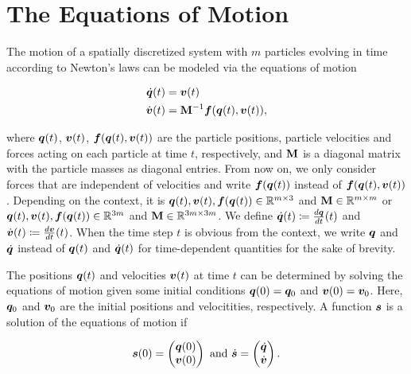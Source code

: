 \section{The Equations of Motion}\label{s:equations-of-motion}

The motion of a spatially discretized system with $m$ particles evolving in time according to Newton's laws can be modeled via 
the equations of motion

\begin{align}
    \begin{split}\label{eq:equations-of-motion}
        \dot{\bm{q}}(t) &= \bm{v}(t) \\
        \dot{\bm{v}}(t) &= \mathbf{M}^{-1}\bm{f}(\bm{q}(t), \bm{v}(t)),
    \end{split}
\end{align}

\noindent where $\bm{q}(t)$, $\bm{v}(t)$, $\bm{f}(\bm{q}(t), \bm{v}(t))$ are the particle positions, particle velocities and 
forces acting on each particle at time $t$, respectively, and $\mathbf{M}$ is a diagonal matrix with the particle masses as diagonal entries. 
From now on, we only consider forces that are independent of velocities and write $\bm{f}(\bm{q}(t))$ instead of 
$\bm{f}(\bm{q}(t), \bm{v}(t))$. Depending on the context, it is
$\bm{q}(t), \bm{v}(t), \bm{f}(\bm{q}(t)) \in \mathbb{R}^{m \times 3}$ and $\mathbf{M} \in \mathbb{R}^{m \times m}$ or 
$\bm{q}(t), \bm{v}(t), \bm{f}(\bm{q}(t)) \in \mathbb{R}^{3m}$ and $\mathbf{M} 
\in \mathbb{R}^{3m \times 3m}$. We define $\dot{\bm{q}}(t) \coloneqq \frac{d\bm{q}}{dt}(t)$ and $\dot{\bm{v}}(t) \coloneqq 
\frac{d\bm{v}}{dt}(t)$. When the time step $t$ is obvious from the context, we write $\bm{q}$ and $\dot{\bm{q}}$ instead of 
$\bm{q}(t)$ and $\dot{\bm{q}}(t)$ for time-dependent quantities for the sake of brevity.

The positions $\bm{q}(t)$ and velocities $\bm{v}(t)$ at time $t$ can be determined by solving the equations of motion given some initial conditions
$\bm{q}(0) = \bm{q}_0$ and $\bm{v}(0) = \bm{v}_0$. Here, $\bm{q}_0$ and $\bm{v}_0$ are the initial positions and velocitities, respectively. 
A function $\bm{s}$ is a solution of the equations of motion if 

\[
    \bm{s}(0) = 
    \begin{pmatrix}
        \bm{q}(0)\\
        \bm{v}(0)
    \end{pmatrix} 
    \text{ and } 
    \dot{\bm{s}} = 
    \begin{pmatrix}
        \dot{\bm{q}}\\
        \dot{\bm{v}}
    \end{pmatrix}.
\]

